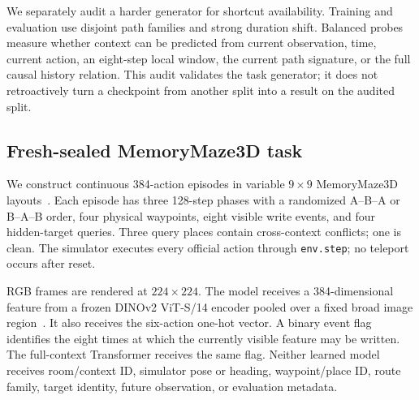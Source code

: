 \documentclass{article}
\begin{document}
We separately audit a harder generator for shortcut availability.
Training and evaluation use disjoint path families and strong duration shift.
Balanced probes measure whether context can be predicted from current observation, time, current action, an eight-step local window, the current path signature, or the full causal history relation.
This audit validates the task generator; it does not retroactively turn a checkpoint from another split into a result on the audited split.

\subsection{Fresh-sealed MemoryMaze3D task}

We construct continuous 384-action episodes in variable $9\times9$ MemoryMaze3D layouts~\citep{pasukonis2023memorymaze}.
Each episode has three 128-step phases with a randomized A--B--A or B--A--B order, four physical waypoints, eight visible write events, and four hidden-target queries.
Three query places contain cross-context conflicts; one is clean.
The simulator executes every official action through \texttt{env.step}; no teleport occurs after reset.

RGB frames are rendered at $224\times224$.
The model receives a 384-dimensional feature from a frozen DINOv2 ViT-S/14 encoder pooled over a fixed broad image region~\citep{oquab2023dinov2}.
It also receives the six-action one-hot vector.
A binary event flag identifies the eight times at which the currently visible feature may be written.
The full-context Transformer receives the same flag.
Neither learned model receives room/context ID, simulator pose or heading, waypoint/place ID, route family, target identity, future observation, or evaluation metadata.
\end{document}
